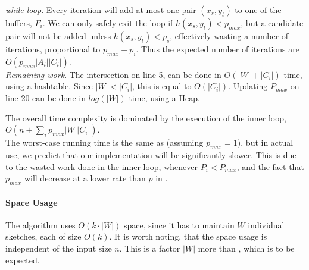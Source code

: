 \documentclass[a4paper,11pt]{article}
\begin{document}
\textit{while loop}. Every iteration will add at most one pair $(x_s, y_t)$ to one of the buffers, $F_i$. We can only safely exit the loop if $h(x_s, y_t) < p_{max}$, but a candidate pair will not be added unless $h(x_s, y_t) < p_s$, effectively wasting a number of iterations, proportional to $p_{max}-p_i$. Thus the expected number of iterations are $O(p_{max}|A_i||C_i|)$.\\

\textit{Remaining work}.
The intersection on line 5, can be done in $O(|W|+|C_i|)$ time, using a hashtable. Since $|W|<|C_i|$, this is equal to $O(|C_i|)$.
Updating $P_{max}$ on line 20 can be done in $log(|W|)$ time, using a Heap.

The overall time complexity is dominated by the execution of the inner loop, $O(n + \sum_i p_{max}|W||C_i|)$.\\

The worst-case running time is the same as \cite{paper:amossen} (assuming $p_{max} = 1$), but in actual use, we predict that our implementation will be significantly slower. This is due to the wasted work done in the inner loop, whenever $P_i < P_{max}$, and the fact that $p_{max}$ will decrease at a lower rate than $p$ in \cite{paper:amossen}.

\paragraph{Space Usage}
The algorithm uses $O(k\cdot|W|)$ space, since it has to maintain $W$ individual sketches, each of size $O(k)$. It is worth noting, that the space usage is independent of the input size $n$. This is a factor $|W|$ more than \cite{paper:amossen}, which is to be expected.
\end{document}
